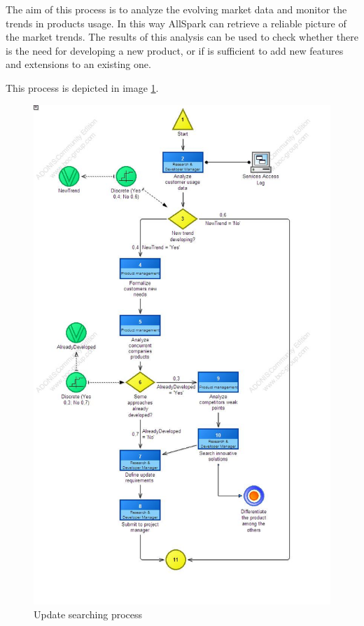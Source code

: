The aim of this process is to analyze the evolving market data and monitor
the trends in products usage. In this way AllSpark can retrieve a reliable
picture of the market trends.
The results of this analysis can be used to check whether there is the need
for developing a new product, or if is sufficient to add new features and
extensions to an existing one.

This process is depicted in image \ref{2img:search_upd}.

\begin{figure}[!ht]
\begin{centering}
\includegraphics[scale=0.40]{assign2/adonis/imgs/search_upd.jpg}
\caption{Update searching process}
\label{2img:search_upd}
\end{centering}
\end{figure}

